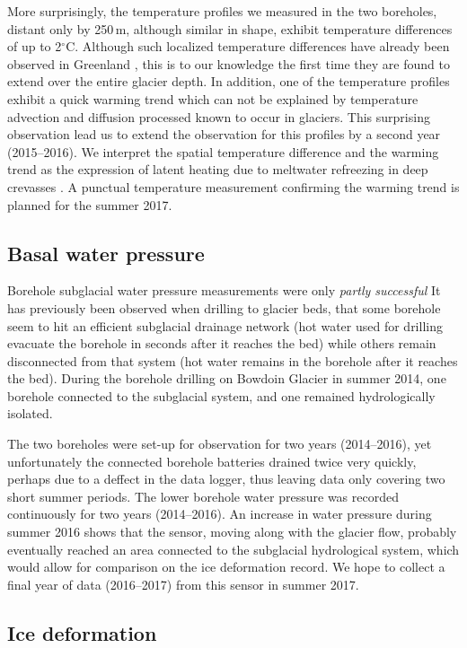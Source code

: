 \documentclass{article}
\newcommand{\unit}[1]{\ensuremath{\mathrm{#1}}}
\newcommand{\degree}[0]{\ensuremath{^{\circ}}}
\newcommand{\degC}[0]{\unit{{\degree}C}}
\begin{document}
More surprisingly, the temperature profiles we measured in the two boreholes,
distant only by 250\,m, although similar in shape, exhibit temperature
differences of up to 2\degC. Although such localized temperature differences
have already been observed in Greenland \citep{Luthi.etal.20xx}, this is to our
knowledge the first time they are found to extend over the entire glacier
depth. In addition, one of the temperature profiles exhibit a quick warming
trend which can not be explained by temperature advection and diffusion
processed known to occur in glaciers. This surprising observation lead us to
extend the observation for this profiles by a second year (2015--2016). We
interpret the spatial temperature difference and the warming trend as the
expression of latent heating due to meltwater refreezing in deep crevasses
\citep{Seguinot.etal.inprepa}. A punctual temperature measurement confirming
the warming trend is planned for the summer 2017.


\subsection{Basal water pressure}

Borehole subglacial water pressure measurements were only \emph{partly
successful} It has previously been observed when drilling to glacier beds, that
some borehole seem to hit an efficient subglacial drainage network (hot water
used for drilling evacuate the borehole in seconds after it reaches the bed)
while others remain disconnected from that system (hot water remains in the
borehole after it reaches the bed). During the borehole drilling on Bowdoin
Glacier in summer 2014, one borehole connected to the subglacial system, and
one remained hydrologically isolated.

The two boreholes were set-up for observation for two years (2014--2016), yet
unfortunately the connected borehole batteries drained twice very quickly,
perhaps due to a deffect in the data logger, thus leaving data only covering two
short summer periods. The lower borehole water pressure was recorded
continuously for two years (2014--2016). An increase in water pressure during
summer 2016 shows that the sensor, moving along with the glacier flow, probably
eventually reached an area connected to the subglacial hydrological system,
which would allow for comparison on the ice deformation record. We hope to
collect a final year of data (2016--2017) from this sensor in summer 2017.


\subsection{Ice deformation}
\end{document}
